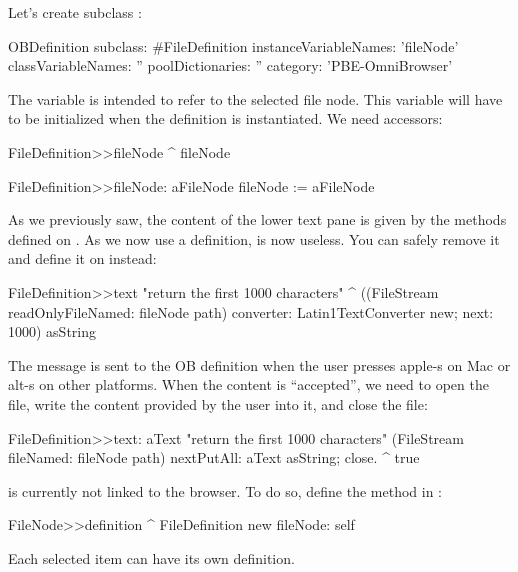 \documentclass[a4paper,10pt,twoside]{book}
\begin{document}
Let's create subclass :

\begin{code}{}    
OBDefinition subclass: #FileDefinition
	instanceVariableNames: 'fileNode'
	classVariableNames: ''
	poolDictionaries: ''
	category: 'PBE-OmniBrowser'
\end{code}

The variable  is intended to refer to the selected file node. This variable will have to be initialized when the definition is instantiated. We need accessors:

\begin{code}{}    
FileDefinition>>fileNode
	^ fileNode

FileDefinition>>fileNode: aFileNode
	fileNode := aFileNode
\end{code}

As we previously saw, the content of the lower text pane is given by the  methods defined on . As we now use a definition,  is now useless. You can safely remove it and define it on  instead:

\begin{code}{}
FileDefinition>>text
	"return the first 1000 characters"
     ^ ((FileStream readOnlyFileNamed: fileNode path) converter: Latin1TextConverter new; 
              next: 1000) asString
\end{code}

The message  is sent to the OB definition when the user presses apple-s  on Mac or alt-s on other platforms. When the content is ``accepted'', we need to open the file, write the content provided by the user into it, and close the file:

\begin{code}{}
FileDefinition>>text: aText
	"return the first 1000 characters"
     (FileStream fileNamed: fileNode path) 
				nextPutAll: aText asString;
				close.
	^ true
\end{code}

 is currently not linked to the browser. To do so, define the method  in :

\begin{code}{}
FileNode>>definition
	^ FileDefinition new fileNode: self
\end{code}

Each selected item can have its own definition. 

\end{document}
